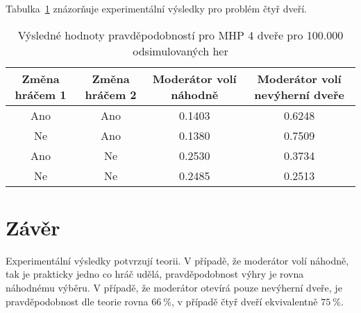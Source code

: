 Tabulka~\ref{table:table2} znázorňuje experimentální výsledky pro problém čtyř dveří.

\begin{table}[htb]
    \centering

    \begin{tabular}{cccc}
        \toprule

        Změna hráčem 1  & Změna hráčem 2    & Moderátor volí náhodně    & Moderátor volí nevýherní dveře    \\ \midrule
        Ano             & Ano               & 0.1403                    & 0.6248                            \\
        Ne              & Ano               & 0.1380                    & 0.7509                            \\
        Ano             & Ne                & 0.2530                    & 0.3734                            \\
        Ne              & Ne                & 0.2485                    & 0.2513                            \\

        \bottomrule
    \end{tabular}

    \caption{Výsledné hodnoty pravděpodobností pro MHP 4 dveře pro 100.000 odsimulovaných her}
    \label{table:table2}
\end{table}
\FloatBarrier

\section{Závěr}

Experimentální výsledky potvrzují teorii.
V případě, že moderátor volí náhodně, tak je prakticky jedno co hráč udělá, pravděpodobnost výhry je rovna náhodnému výběru.
V případě, že moderátor otevírá pouze nevýherní dveře, je pravděpodobnost dle teorie rovna \( 66 \: \% \), v případě čtyř dveří ekvivalentně \( 75 \: \% \).

